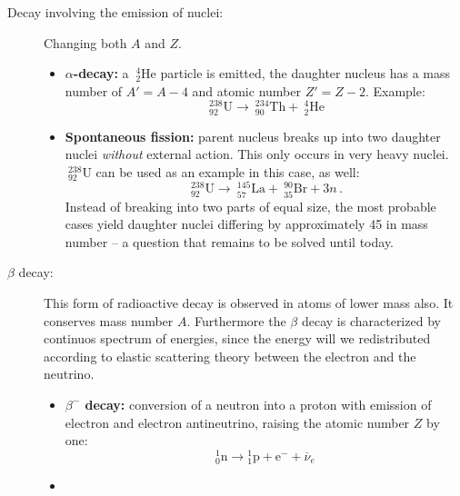 \begin{description}
    \item [Decay involving the emission of nuclei:] Changing both $A$ and $Z$.
        \begin{itemize}
            \item
                \textbf{$\alpha$-decay:} a $~_2^4$He particle is emitted, the daughter nucleus 
                has a mass number of $A' = A - 4$ and atomic number $Z' = Z - 2$. Example:
                \begin{equation}
                    \mathrm{~^{238}_{92}U}\rightarrow\mathrm{~^{234}_{90}Th} + \mathrm{~^{4}_{2}He} 
                \end{equation}
            \item
                \textbf{Spontaneous fission:} parent nucleus breaks up into two daughter nuclei \emph{without}
                external action. This only occurs in very heavy nuclei. $\mathrm{~^{238}_{92}U}$ can be
                used as an example in this case, as well:
                \begin{equation}
                    \mathrm{~^{238}_{92}U}\rightarrow\mathrm{~^{145}_{57}La} + \mathrm{~^{90}_{35}Br} + 3n  \, .
                \end{equation}
                Instead of breaking into two parts of equal size, the most probable cases yield daughter 
                nuclei differing by approximately 45 in mass number -- a question that remains to be solved 
                until today.
        \end{itemize}
    \item [$\beta$ decay:]
        This form of radioactive decay is observed in atoms of lower mass also. 
        It conserves mass number $A$. Furthermore the $\beta$ decay is characterized by 
        continuos spectrum of energies, since the energy will we redistributed according to
        elastic scattering theory between the electron and the neutrino.
        \begin{itemize}
            \item
                \textbf{$\beta^-$ decay:} conversion of a neutron into a proton with emission of electron and 
                electron antineutrino, raising the atomic number $Z$ by one:
                \begin{equation}
                    {}^{1}_{0} \mathrm {n} \to {}^{1}_{1} \mathrm {p} + \mathrm{e}^{-} + \overline{\nu}_e 
                \end{equation}
            \item

\end{itemize}
\end{description}
